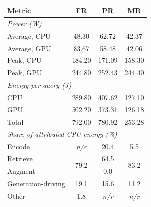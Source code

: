 \begin{table}[t]
\centering
\caption{}
\label{tab:power_energy}
{\small
\setlength{\tabcolsep}{4pt}
\begin{tabular}{lccc}
\toprule
\textbf{Metric} & \textbf{FR} & \textbf{PR} & \textbf{MR} \\
\midrule
\multicolumn{4}{l}{\emph{Power (W)}} \\
\quad Average, CPU & 48.30 & 62.72 & 42.37 \\
\quad Average, GPU & 83.67 & 58.48 & 42.06 \\
\quad Peak, CPU & 184.20 & 171.09 & 158.30 \\
\quad Peak, GPU & 244.80 & 252.43 & 244.40 \\
\midrule
\multicolumn{4}{l}{\emph{Energy per query (J)}} \\
\quad CPU & 289.80 & 407.62 & 127.10 \\
\quad GPU & 502.20 & 373.31 & 126.18 \\
\quad Total & 792.00 & 780.92 & 253.28 \\
\midrule
\multicolumn{4}{l}{\emph{Share of attributed CPU energy (\%)}} \\
\quad Encode & \emph{n/r} & 20.4 & 5.5 \\
\quad Retrieve & \multirow{2}{*}{79.2} & 64.5 & \multirow{2}{*}{83.2} \\
\quad Augment & & 0.0 & \\
\quad Generation-driving & 19.1 & 15.6 & 11.2 \\
\quad Other & 1.8 & \emph{n/r} & \emph{n/r} \\
\bottomrule
\end{tabular}%
}
\end{table}
